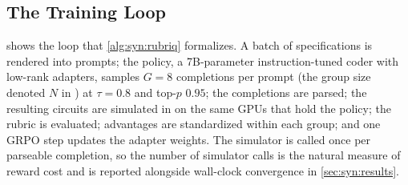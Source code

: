 \subsection{The Training Loop}\label{sec:syn:loop}

 shows the loop that \cref{alg:syn:rubriq} formalizes. A batch of specifications is rendered into prompts; the policy, a 7B-parameter instruction-tuned coder with low-rank adapters, samples $G=8$ completions per prompt (the group size denoted $N$ in \cite{guo2026rubriq}) at $\tau=0.8$ and top-$p$ $0.95$; the completions are parsed; the resulting circuits are simulated in \cudaq{} on the same GPUs that hold the policy; the rubric is evaluated; advantages are standardized within each group; and one GRPO step updates the adapter weights. The simulator is called once per parseable completion, so the number of simulator calls is the natural measure of reward cost and is reported alongside wall-clock convergence in \cref{sec:syn:results}.

